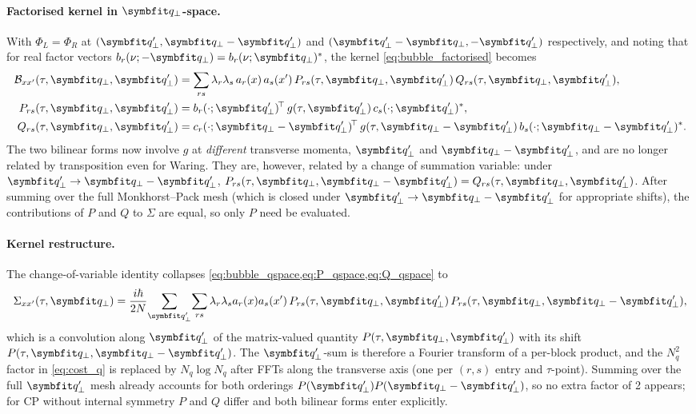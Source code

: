 \paragraph{Factorised kernel in $\qp$-space.}
With $\Phi_L=\Phi_R$ at $(\qp',\qp-\qp')$ and $(\qp'-\qp,-\qp')$
respectively, and noting that for real factor vectors
$b_r(\nu;-\qp)=b_r(\nu;\qp)^{*}$, the kernel
\cref{eq:bubble_factorised} becomes
\begin{align}
  \label{eq:bubble_qspace}
  \mathcal{B}_{xx'}(\tau,\qp,\qp')
  &= \sum_{rs}\lambda_r\lambda_s\,a_r(x)\,a_s(x')\,
      P_{rs}(\tau,\qp,\qp')\,Q_{rs}(\tau,\qp,\qp'),\\
  \label{eq:P_qspace}
  P_{rs}(\tau,\qp,\qp')
  &= b_r(\cdot;\qp')^{\!\top}\,g(\tau,\qp')\,c_s(\cdot;\qp')^{*},\\
  \label{eq:Q_qspace}
  Q_{rs}(\tau,\qp,\qp')
  &= c_r(\cdot;\qp-\qp')^{\!\top}\,g(\tau,\qp-\qp')\,b_s(\cdot;\qp-\qp')^{*}.
\end{align}
The two bilinear forms now involve $g$ at \emph{different} transverse
momenta, $\qp'$ and $\qp-\qp'$, and are no longer related by transposition
even for Waring. They are, however, related by a change of summation
variable: under $\qp'\to\qp-\qp'$,
$P_{rs}(\tau,\qp,\qp-\qp')=Q_{rs}(\tau,\qp,\qp')$. After summing over
the full Monkhorst--Pack mesh (which is closed under
$\qp'\to\qp-\qp'$ for appropriate shifts), the contributions of $P$ and
$Q$ to $\Sigma$ are equal, so only $P$ need be evaluated.

\paragraph{Kernel restructure.}
The change-of-variable identity collapses
\cref{eq:bubble_qspace,eq:P_qspace,eq:Q_qspace} to
\begin{equation}\label{eq:sigma_qspace_final}
  \Sigma_{xx'}(\tau,\qp)
  = \frac{i\hbar}{2N}\!\sum_{\qp'}\!
    \sum_{rs}\lambda_r\lambda_s a_r(x)a_s(x')\,
    P_{rs}(\tau,\qp,\qp')\,P_{rs}(\tau,\qp,\qp-\qp'),
\end{equation}
which is a convolution along $\qp'$ of the matrix-valued quantity
$P(\tau,\qp,\qp')$ with its shift $P(\tau,\qp,\qp-\qp')$.
The
$\qp'$-sum is therefore a Fourier transform of a per-block product, and
the $N_q^{2}$ factor in \cref{eq:cost_q} is replaced by
$N_q \log N_q$ after FFTs along the transverse axis (one per $(r,s)$
entry and $\tau$-point).
Summing over the full $\qp'$ mesh already accounts for both orderings
$P(\qp')P(\qp-\qp')$, so no extra factor of 2 appears; for CP without
internal symmetry $P$ and $Q$ differ and both bilinear forms enter
explicitly.

